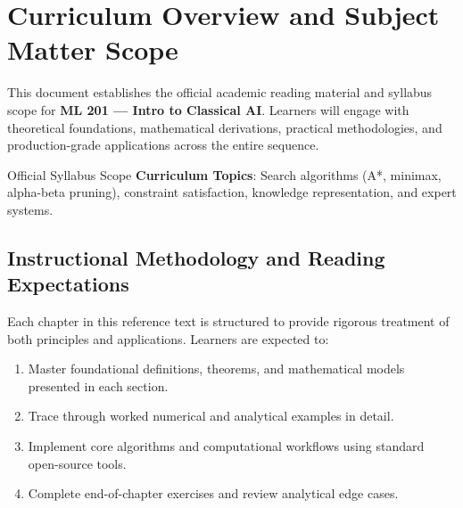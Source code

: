 \section{Curriculum Overview and Subject Matter Scope}

This document establishes the official academic reading material and syllabus scope for \textbf{ML 201 --- Intro to Classical AI}. Learners will engage with theoretical foundations, mathematical derivations, practical methodologies, and production-grade applications across the entire sequence.

\begin{InsightBox}{Official Syllabus Scope}
  \textbf{Curriculum Topics}: Search algorithms (A*, minimax, alpha-beta pruning), constraint satisfaction, knowledge representation, and expert systems.
\end{InsightBox}

\subsection{Instructional Methodology and Reading Expectations}

Each chapter in this reference text is structured to provide rigorous treatment of both principles and applications. Learners are expected to:
\begin{enumerate}
  \item Master foundational definitions, theorems, and mathematical models presented in each section.
  \item Trace through worked numerical and analytical examples in detail.
  \item Implement core algorithms and computational workflows using standard open-source tools.
  \item Complete end-of-chapter exercises and review analytical edge cases.
\end{enumerate}

